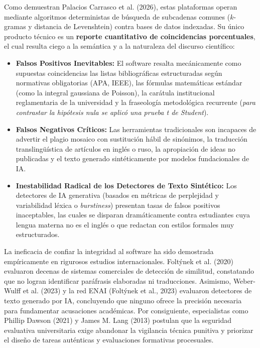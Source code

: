 Como demuestran Palacios Carrasco et al. (2026), estas plataformas operan mediante algoritmos deterministas de búsqueda de subcadenas comunes ($k$-gramas y distancia de Levenshtein) contra bases de datos indexadas. Su único producto técnico es un \textbf{reporte cuantitativo de coincidencias porcentuales}, el cual resulta ciego a la semántica y a la naturaleza del discurso científico:
\begin{itemize}
    \item \textbf{Falsos Positivos Inevitables:} El software resalta mecánicamente como supuestas coincidencias las listas bibliográficas estructuradas según normativas obligatorias (APA, IEEE), las fórmulas matemáticas estándar (como la integral gaussiana de Poisson), la carátula institucional reglamentaria de la universidad y la fraseología metodológica recurrente (\textsl{\guillemotleft para contrastar la hipótesis nula se aplicó una prueba t de Student\guillemotright}).
    \item \textbf{Falsos Negativos Críticos:} Las herramientas tradicionales son incapaces de advertir el plagio mosaico con sustitución hábil de sinónimos, la traducción translingüística de artículos en inglés o ruso, la apropiación de ideas no publicadas y el texto generado sintéticamente por modelos fundacionales de IA.
    \item \textbf{Inestabilidad Radical de los Detectores de Texto Sintético:} Los detectores de IA generativa (basados en métricas de perplejidad y variabilidad léxica o \textit{burstiness}) presentan tasas de falsos positivos inaceptables, las cuales se disparan dramáticamente contra estudiantes cuya lengua materna no es el inglés o que redactan con estilos formales muy estructurados.
\end{itemize}

La ineficacia de confiar la integridad al software ha sido demostrada empíricamente en rigurosos estudios internacionales. Foltýnek et al. (2020) evaluaron decenas de sistemas comerciales de detección de similitud, constatando que no logran identificar paráfrasis elaboradas ni traducciones. Asimismo, Weber-Wulff et al. (2023) y la red ENAI (Foltýnek et al., 2023) evaluaron detectores de texto generado por IA, concluyendo que ninguno ofrece la precisión necesaria para fundamentar acusaciones académicas. Por consiguiente, especialistas como Phillip Dawson (2021) y James M. Lang (2013) postulan que la seguridad evaluativa universitaria exige abandonar la vigilancia técnica punitiva y priorizar el diseño de tareas auténticas y evaluaciones formativas procesuales.

